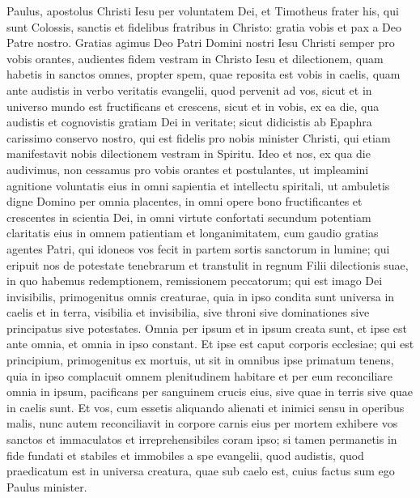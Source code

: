 \begin{biblechapter}
 \verse Paulus, apostolus Christi Iesu per voluntatem Dei, et Timotheus frater 
\verse his, qui sunt Colossis, sanctis et fidelibus fratribus in Christo: gratia vobis et pax a Deo Patre nostro.
 \verse Gratias agimus Deo Patri Domini nostri Iesu Christi semper pro vobis orantes, 
\verse audientes fidem vestram in Christo Iesu et dilectionem, quam habetis in sanctos omnes, 
\verse propter spem, quae reposita est vobis in caelis, quam ante audistis in verbo veritatis evangelii, 
\verse quod pervenit ad vos, sicut et in universo mundo est fructificans et crescens, sicut et in vobis, ex ea die, qua audistis et cognovistis gratiam Dei in veritate; 
\verse sicut didicistis ab Epaphra carissimo conservo nostro, qui est fidelis pro nobis minister Christi, 
 \verse qui etiam manifestavit nobis dilectionem vestram in Spiritu.
 \verse Ideo et nos, ex qua die audivimus, non cessamus pro vobis orantes et postulantes, ut impleamini agnitione voluntatis eius in omni sapientia et intellectu spiritali, 
\verse ut ambuletis digne Domino per omnia placentes, in omni opere bono fructificantes et crescentes in scientia Dei, 
\verse in omni virtute confortati secundum potentiam claritatis eius in omnem patientiam et longanimitatem, cum gaudio
 \verse gratias agentes Patri,
 qui idoneos vos fecit in partem sortis sanctorum in lumine;
 \verse qui eripuit nos de potestate tenebrarum
 et transtulit in regnum Filii dilectionis suae,
 \verse in quo habemus redemptionem,
 remissionem peccatorum;
 \verse qui est imago Dei invisibilis,
 primogenitus omnis creaturae,
 \verse quia in ipso condita sunt universa in caelis et in terra,
 visibilia et invisibilia,
 sive throni sive dominationes
 sive principatus sive potestates.
 Omnia per ipsum et in ipsum creata sunt,
 \verse et ipse est ante omnia,
 et omnia in ipso constant.
 \verse Et ipse est caput corporis ecclesiae;
 qui est principium, primogenitus ex mortuis,
 ut sit in omnibus ipse primatum tenens,
 \verse quia in ipso complacuit omnem plenitudinem habitare
 \verse et per eum reconciliare omnia in ipsum,
 pacificans per sanguinem crucis eius,
 sive quae in terris sive quae in caelis sunt.
 \verse Et vos, cum essetis aliquando alienati et inimici sensu in operibus malis, 
 \verse nunc autem reconciliavit in corpore carnis eius per mortem exhibere vos sanctos et immaculatos et irreprehensibiles coram ipso; 
\verse si tamen permanetis in fide fundati et stabiles et immobiles a spe evangelii, quod audistis, quod praedicatum est in universa creatura, quae sub caelo est, cuius factus sum ego Paulus minister.

\end{biblechapter}
